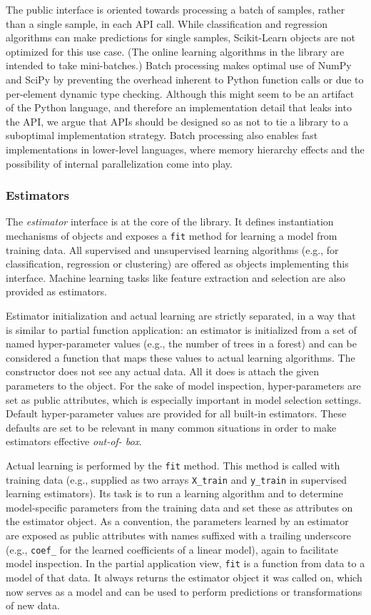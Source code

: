 The public interface is oriented towards processing a batch of samples, rather
than a single sample, in each API call. While classification and regression
algorithms can make predictions for single samples, Scikit-Learn objects are
not optimized for this use case. (The online learning algorithms in the library
are intended to take mini-batches.) Batch processing makes optimal use of NumPy
and SciPy by preventing the overhead inherent to Python function calls or due
to per-element dynamic type checking. Although this might seem to be an
artifact of the Python language, and therefore an implementation detail that
leaks into the API, we argue that APIs should be designed so as not to tie a
library to a suboptimal implementation strategy. Batch processing also enables
fast implementations in lower-level languages, where memory hierarchy effects
and the possibility of internal parallelization come into play.

\subsubsection{Estimators}

The \textit{estimator} interface is at the core of the library. It defines
instantiation mechanisms of objects and exposes a \texttt{fit} method for
learning a model from training data.  All supervised and unsupervised learning
algorithms (e.g., for classification, regression or clustering) are offered as
objects implementing this interface. Machine learning tasks like feature
extraction and selection are also provided as estimators.

Estimator initialization and actual learning are strictly separated, in a way
that is similar to partial function application: an estimator is initialized
from a set of named hyper-parameter values (e.g., the number of trees in a
forest) and can be considered a function that maps these values to actual
learning algorithms. The constructor does not see any actual data. All it does
is attach the given parameters to the object. For the sake of model inspection,
hyper-parameters are set as public attributes, which is especially important in
model selection settings. Default hyper-parameter values are provided for all
built-in estimators. These defaults are set to be relevant in many common
situations in order to make estimators effective \textit{out-of- box}.

Actual learning is performed by the \texttt{fit} method. This method is called
with training data (e.g., supplied as two arrays \texttt{X\_train} and
\texttt{y\_train} in supervised learning estimators). Its task is to run a
learning algorithm and to determine model-specific parameters from the training
data and set these as attributes on the estimator object. As a convention, the
parameters learned by an estimator are exposed as public attributes with names
suffixed with a trailing underscore (e.g., \texttt{coef\_} for the learned
coefficients of a linear model), again to facilitate model inspection. In the
partial application view, \texttt{fit} is a function from data to a model of
that data. It always returns the estimator object it was called on, which now
serves as a model and can be used to perform predictions or transformations of
new data.

